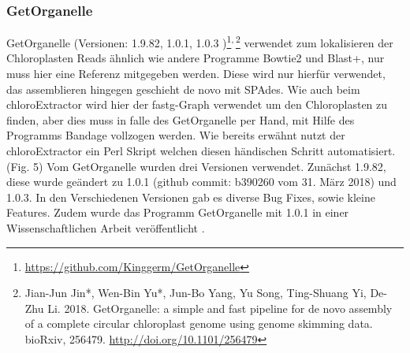 \documentclass{scrartcl}
\begin{document}
\subsubsection{GetOrganelle}
\label{sec-2-5-5}
GetOrganelle (Versionen: 1.9.82, 1.0.1, 1.0.3 )\footnote{\url{https://github.com/Kinggerm/GetOrganelle}}\textsuperscript{,}\,\footnote{Jian-Jun Jin*, Wen-Bin Yu*, Jun-Bo Yang, Yu Song, Ting-Shuang Yi, De-Zhu Li. 2018. GetOrganelle: a simple and fast pipeline for de novo assembly of a complete circular chloroplast genome using genome skimming data. bioRxiv, 256479. \url{http://doi.org/10.1101/256479}} verwendet zum lokalisieren der Chloroplasten Reads ähnlich wie andere Programme Bowtie2 \footnotemark[18]{} und Blast+, nur muss hier eine Referenz mitgegeben werden. 
Diese wird nur hierfür
verwendet, das assemblieren hingegen geschieht de novo mit SPAdes. Wie auch beim chloroExtractor wird hier der fastg-Graph verwendet um den Chloroplasten zu finden, aber dies muss in falle 
des GetOrganelle per Hand, mit Hilfe des Programms Bandage vollzogen werden. Wie bereits erwähnt nutzt der chloroExtractor ein Perl Skript welchen diesen händischen Schritt automatisiert.(Fig. 5) 
Vom GetOrganelle wurden drei Versionen verwendet. Zunächst 1.9.82, diese wurde geändert zu 1.0.1 (github commit: b390260 vom 31. März 2018) und 1.0.3. In den Verschiedenen Versionen gab es diverse Bug Fixes, sowie
kleine Features.
Zudem wurde das Programm GetOrganelle mit 1.0.1 in einer Wissenschaftlichen Arbeit veröffentlicht \footnotemark[28]{}.
\end{document}
